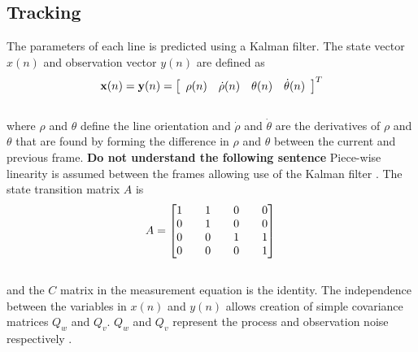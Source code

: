\documentclass{article}
\begin{document}
\subsection{Tracking}
The parameters of each line is predicted using a Kalman filter.
The state vector $x(n)$ and observation vector $y(n)$ are defined as
\begin{equation}
    {\bf x}(n)= {\bf y}(n)
     = \left[ \begin{array}{cccc}
        \rho (n) & \dot{\rho}(n) & \theta (n) & \dot{\theta}(n)
        \end{array} \right]^T
\label{eq:state_measure_vectors}
\end{equation}\\
where $\rho$ and $\theta$ define the line orientation and $\dot{\rho}$ and $\dot{\theta}$ are the derivatives of $\rho$ and $\theta$ that are found by forming the difference in $\rho $ and $\theta $ between the current and previous frame. 
{\bf Do not understand the following sentence} Piece-wise linearity is assumed between the frames allowing use of the Kalman filter \cite{hayes_statistical_1996,brookner_tracking_1998}.
The state transition matrix $A$ is
\begin{equation}
A = \begin{bmatrix} 1 && 1 && 0 && 0 \\ 0 && 1 && 0 && 0 \\ 0 && 0 && 1 && 1 \\ 0 && 0 && 0 && 1 \\\end{bmatrix}\\
\label{eq:state_trans}
\end{equation}\\
and the $C$ matrix in the measurement equation is the identity.
The independence between the variables in $x(n)$ and $y(n)$ allows creation of simple covariance matrices $Q_w$ and $Q_v$. $Q_w$ and $Q_v$ represent the process and observation noise respectively \cite{hayes_statistical_1996}.
\end{document}
